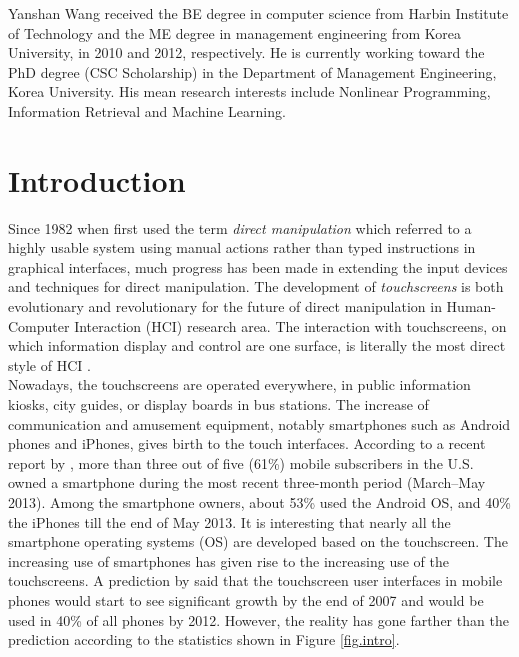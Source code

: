 \documentclass{singlecol-new}
\theoremstyle{TH}{
\newtheorem{lemma}{Lemma}
\newtheorem{theorem}[lemma]{Theorem}
\newtheorem{corrolary}[lemma]{Corrolary}
\newtheorem{conjecture}[lemma]{Conjecture}
\newtheorem{proposition}[lemma]{Proposition}
\newtheorem{claim}[lemma]{Claim}
\newtheorem{stheorem}[lemma]{Wrong Theorem}
\newtheorem{algorithm}{Algorithm}
}
\theoremstyle{THrm}{
\newtheorem{definition}{Definition}[section]
\newtheorem{question}{Question}[section]
\newtheorem{remark}{Remark}
\newtheorem{scheme}{Scheme}
}
\theoremstyle{THhit}{
\newtheorem{case}{Case}[section]
}
\begin{document}


\begin{bio}
Yanshan Wang received the BE degree in computer science from Harbin Institute of Technology and the ME degree in management engineering from Korea University, in 2010 and 2012, respectively. He is currently working toward the PhD degree (CSC Scholarship) in the Department of Management Engineering, Korea University. His mean research interests include Nonlinear Programming, Information Retrieval and Machine Learning.
\end{bio}

\maketitle


\section{Introduction}

Since 1982 when \citet{shneiderman1982future} first used the term \textit{direct manipulation} which referred to a highly usable system using manual actions rather than typed instructions in graphical interfaces, much progress has been made in extending the input devices and techniques for direct manipulation. The development of \textit{touchscreens} is both evolutionary and revolutionary for the future of direct manipulation in Human-Computer Interaction (HCI) research area. The interaction with touchscreens, on which information display and control are one surface, is literally the most direct style of HCI \citep{albinsson2003high}. \\

Nowadays, the touchscreens are operated everywhere, in public information kiosks, city guides, or display boards in bus stations. The increase of communication and amusement equipment, notably smartphones such as Android phones and iPhones, gives birth to the touch interfaces. According to a recent report by \citet{nielsen}, more than three out of five (61\%) mobile subscribers in the U.S. owned a smartphone during the most recent three-month period (March--May 2013). Among the smartphone owners, about 53\% used the Android OS, and 40\% the iPhones till the end of May 2013. It is interesting that nearly all the smartphone operating systems (OS) are developed based on the touchscreen. The increasing use of smartphones has given rise to the increasing use of the touchscreens. A prediction by \citet{stranal} said that the touchscreen user interfaces in mobile phones would start to see significant growth by the end of 2007 and would be used in 40\% of all phones by 2012. However, the reality has gone farther than the prediction according to the statistics shown in Figure \ref{fig.intro}. \\
\end{document}
